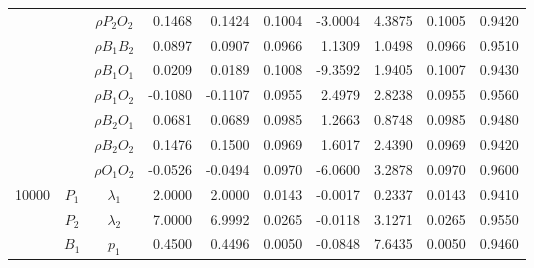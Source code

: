 \documentclass[letterpaper]{article}
\begin{document}
\begin{table}[h]
\begin{tabular}{cccrrrrrrr}
            &             & $\rho{P_2O_2}$ & 0.1468                 & 0.1424                 & 0.1004                 & -3.0004                & 4.3875                 & 0.1005                   & 0.9420                 \\
            &             & $\rho{B_1B_2}$ & 0.0897                 & 0.0907                 & 0.0966                 & 1.1309                 & 1.0498                 & 0.0966                   & 0.9510                 \\
            &             & $\rho{B_1O_1}$ & 0.0209                 & 0.0189                 & 0.1008                 & -9.3592                & 1.9405                 & 0.1007                   & 0.9430                 \\
            &             & $\rho{B_1O_2}$ & -0.1080                & -0.1107                & 0.0955                 & 2.4979                 & 2.8238                 & 0.0955                   & 0.9560                 \\
            &             & $\rho{B_2O_1}$ & 0.0681                 & 0.0689                 & 0.0985                 & 1.2663                 & 0.8748                 & 0.0985                   & 0.9480                 \\
            &             & $\rho{B_2O_2}$ & 0.1476                 & 0.1500                 & 0.0969                 & 1.6017                 & 2.4390                 & 0.0969                   & 0.9420                 \\
            &             & $\rho{O_1O_2}$ & -0.0526                & -0.0494                & 0.0970                 & -6.0600                & 3.2878                 & 0.0970                   & 0.9600                 \\\hline
10000       & $P_1$       & $\lambda_1$    & 2.0000                 & 2.0000                 & 0.0143                 & -0.0017                & 0.2337                 & 0.0143                   & 0.9410                 \\  
            & $P_2$       & $\lambda_2$    & 7.0000                 & 6.9992                 & 0.0265                 & -0.0118                & 3.1271                 & 0.0265                   & 0.9550                 \\
            & $B_1$       & $p_1$          & 0.4500                 & 0.4496                 & 0.0050                 & -0.0848                & 7.6435                 & 0.0050                   & 0.9460                 \\

\end{tabular}
\end{table}
\end{document}
